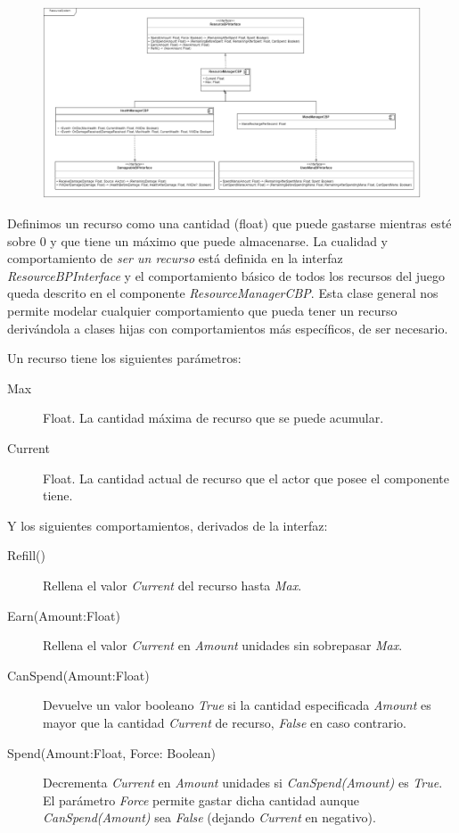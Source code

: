 \documentclass[12pt]{report}
\begin{document}
\begin{figure}[H]
    \centering
    \includegraphics[width=1\textwidth]{resources_diagram}
\end{figure}

Definimos un recurso como una cantidad (float) que puede gastarse mientras esté sobre 0 y que tiene un máximo que puede almacenarse. La cualidad y comportamiento de \textit{ser un recurso} está definida en la interfaz \textit{\emph{ResourceBPInterface}} y el comportamiento básico de todos los recursos del juego queda descrito en el componente \textit{\emph{ResourceManagerCBP}}. Esta clase general nos permite modelar cualquier comportamiento que pueda tener un recurso derivándola a clases hijas con comportamientos más específicos, de ser necesario.

Un recurso tiene los siguientes parámetros:

\begin{description}
	\item[Max] Float. La cantidad máxima de recurso que se puede acumular.
	\item[Current] Float. La cantidad actual de recurso que el actor que posee el componente tiene.
\end{description}

Y los siguientes comportamientos, derivados de la interfaz:

\begin{description}
	\item[Refill()] Rellena el valor \textit{Current} del recurso hasta \textit{Max}.
	\item[Earn(Amount:Float)] Rellena el valor \textit{Current} en \textit{Amount} unidades sin sobrepasar \textit{Max}.
	\item[CanSpend(Amount:Float)] Devuelve un valor booleano \textit{True} si la cantidad especificada \textit{Amount} es mayor que la cantidad \textit{Current} de recurso, \textit{False} en caso contrario.
	\item[Spend(Amount:Float, Force: Boolean)] Decrementa \textit{Current} en \textit{Amount} unidades si \textit{CanSpend(Amount)} es \textit{True}. El parámetro \textit{Force} permite gastar dicha cantidad aunque \textit{CanSpend(Amount)} sea \textit{False} (dejando \textit{Current} en negativo).
\end{description}
\end{document}
